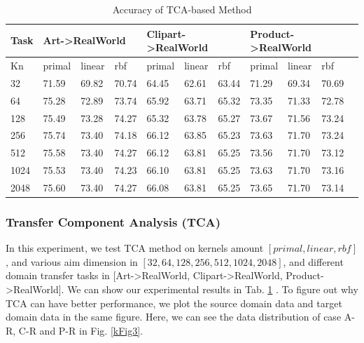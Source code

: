 \documentclass[conference]{IEEEtran}
\begin{document}
\begin{table}[htbp]
\caption{Accuracy of TCA-based Method}
\label{kbase1}%
\begin{tabular}{@{}p{0.3cm}<{\centering}|l|l|l|l|l|l|l|l|l|l|}
\hline
Task & \multicolumn{3}{l|}{Art-\textgreater{}RealWorld} & \multicolumn{3}{l|}{Clipart-\textgreater{}RealWorld} & \multicolumn{3}{l|}{Product-\textgreater{}RealWorld} \\ \hline
Kn   & primal          & linear         & rbf           & primal           & linear           & rbf            & primal           & linear           & rbf            \\ \hline
32       & 71.59           & 69.82          & 70.74         & 64.45            & 62.61            & 63.44          & 71.29            & 69.34            & 70.69          \\ \hline
64       & 75.28           & 72.89          & 73.74         & 65.92            & 63.71            & 65.32          & 73.35            & 71.33            & 72.78          \\ \hline
128      & 75.49           & 73.28          & 74.27         & 65.32            & 63.78            & 65.27          & 73.67            & 71.56            & 73.24          \\ \hline
256      & 75.74           & 73.40          & 74.18         & 66.12            & 63.85            & 65.23          & 73.63            & 71.70            & 73.24          \\ \hline
512      & 75.58           & 73.40          & 74.27         & 66.12            & 63.81            & 65.25          & 73.56            & 71.70            & 73.12          \\ \hline
1024     & 75.53           & 73.40          & 74.23         & 66.10            & 63.81            & 65.25          & 73.63            & 71.70            & 73.16          \\ \hline
2048     & 75.60           & 73.40          & 74.27         & 66.08            & 63.81            & 65.25          & 73.65            & 71.70            & 73.14          \\ \hline
\end{tabular}
\end{table}

\subsubsection{Transfer Component Analysis (TCA)}

In this experiment, we test TCA method on kernels amount $[primal, linear, rbf]$, and various aim dimension in $[32,64,128,256,512,1024,2048]$, and different domain transfer tasks in [Art->RealWorld, Clipart->RealWorld, Product->RealWorld]. We can show our experimental results in Tab. \ref{kbase1} . To figure out why TCA can have better performance, we plot the source domain data and target domain data in the same figure. Here, we can see the data distribution of case A-R, C-R and P-R in Fig. \ref{kFig3}.
\end{document}
